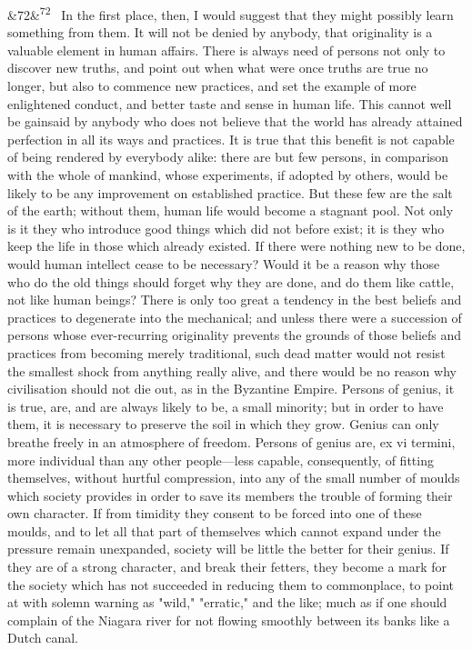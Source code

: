 \documentclass[12pt]{article}
\newcommand{\para}[1][]{\par\noindent\ifx&#1&\else\textsuperscript{\footnotesize #1}~\fi}
\begin{document}
\para[72] In the first place, then, I would suggest that they might possibly learn something from them. It will not be denied by anybody, that originality is a valuable element in human affairs. There is always need of persons not only to discover new truths, and point out when what were once truths are true no longer, but also to commence new practices, and set the example of more enlightened conduct, and better taste and sense in human life. This cannot well be gainsaid by anybody who does not believe that the world has already attained perfection in all its ways and practices. It is true that this benefit is not capable of being rendered by everybody alike: there are but few persons, in comparison with the whole of mankind, whose experiments, if adopted by others, would be likely to be any improvement on established practice. But these few are the salt of the earth; without them, human life would become a stagnant pool. Not only is it they who introduce good things which did not before exist; it is they who keep the life in those which already existed. If there were nothing new to be done, would human intellect cease to be necessary? Would it be a reason why those who do the old things should forget why they are done, and do them like cattle, not like human beings? There is only too great a tendency in the best beliefs and practices to degenerate into the mechanical; and unless there were a succession of persons whose ever-recurring originality prevents the grounds of those beliefs and practices from becoming merely traditional, such dead matter would not resist the smallest shock from anything really alive, and there would be no reason why civilisation should not die out, as in the Byzantine Empire. Persons of genius, it is true, are, and are always likely to be, a small minority; but in order to have them, it is necessary to preserve the soil in which they grow. Genius can only breathe freely in an atmosphere of freedom. Persons of genius are, ex vi termini, more individual than any other people---less capable, consequently, of fitting themselves, without hurtful compression, into any of the small number of moulds which society provides in order to save its members the trouble of forming their own character. If from timidity they consent to be forced into one of these moulds, and to let all that part of themselves which cannot expand under the pressure remain unexpanded, society will be little the better for their genius. If they are of a strong character, and break their fetters, they become a mark for the society which has not succeeded in reducing them to commonplace, to point at with solemn warning as "wild," "erratic," and the like; much as if one should complain of the Niagara river for not flowing smoothly between its banks like a Dutch canal.
\end{document}
